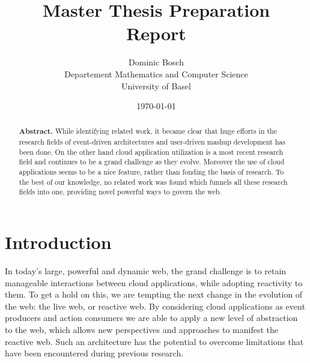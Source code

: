 \documentclass[11pt]{article}%
\begin{document}
\title{Master Thesis Preparation\\Report}
\date{\today}
\author{Dominic Bosch \\ Departement Mathematics and Computer Science \\ University of Basel}

\maketitle

\renewcommand{\abstractname}{}
\begin{abstract}
\textbf{Abstract.}
While identifying related work, it became clear that huge efforts in the research fields of event-driven architectures and user-driven mashup development has been done. On the other hand cloud application utilization is a most recent research field and continues to be a grand challenge as they evolve. Moreover the use of cloud applications seems to be a nice feature, rather than fonding the basis of research. To the best of our knowledge, no related work was found which funnels all these research fields into one, providing novel powerful ways to govern the web.
\end{abstract}

\section{Introduction}
In today's large, powerful and dynamic web, the grand challenge is to retain manageable interactions between cloud applications, while adopting reactivity to them. To get a hold on this, we are tempting the next change in the evolution of the web: the live web, or reactive web. By considering cloud applications as event producers and action consumers we are able to apply a new level of abstraction to the web, which allows new perspectives and approaches to manifest the reactive web. Such an architecture has the potential to overcome limitations that have been encountered during previous research.
\end{document}
